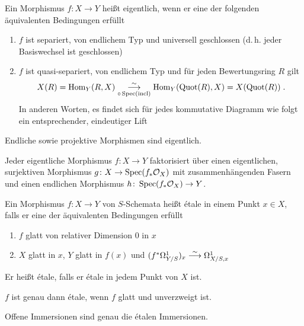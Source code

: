 \documentclass[german]{scrreprt}
\begin{document}
\begin{Definition}
  Ein Morphismus $f\colon X\to Y$ heißt eigentlich, wenn er eine der
  folgenden äquivalenten Bedingungen erfüllt
  \begin{enumerate}[label=(\roman*)]
  \item $f$ ist separiert, von endlichem Typ und universell
    geschlossen (d.\,h. jeder Basiswechsel ist geschlossen)
  \item $f$ ist quasi-separiert, von endlichem Typ und für jeden
    Bewertungsring $R$ gilt
    \begin{gather*}
      X(R)=\operatorname{Hom}_Y(R, X) 
      \overset{\sim}{\underset{\circ\operatorname{Spec}(\operatorname{incl})}
        {\longrightarrow}}
      \operatorname{Hom}_Y(\operatorname{Quot}(R), X)=X(\operatorname{Quot}(R))\;.
    \end{gather*}
    In anderen Worten, es findet sich für jedes kommutative Diagramm
    wie folgt ein entsprechender, eindeutiger Lift
    \begin{center}
    \end{center}
  \end{enumerate}
  Endliche sowie projektive Morphismen sind eigentlich.
  \cite[9.5, Remark 5 und Theorem 9]{bosch}

  \begin{Bemerkung}
    Jeder eigentliche Morphismus $f\colon X\to Y$ faktorisiert über
    einen eigentlichen, surjektiven Morphismus $g\colon X\to
    \operatorname{Spec}(f_*\mathcal{O}_X)$ mit zusammenhängenden Fasern und einen endlichen
    Morphismus $h\colon \operatorname{Spec}(f_*\mathcal{O}_X)\to Y$.
    \cite[9.5, Theorem 12]{bosch}
  \end{Bemerkung}
\end{Definition}


\begin{Definition}%
  Ein Morphismus $f\colon X\to Y$ von $S$-Schemata heißt étale in
  einem Punkt $x\in X$, falls er eine der äquivalenten Bedingungen
  erfüllt 
  \begin{enumerate}[label=(\roman*)]
  \item $f$ glatt von relativer Dimension 0 in $x$
  \item $X$ glatt in $x$, $Y$ glatt in $f(x)$ und 
    $(f^*\Omega_{Y/S}^1)_x \overset{\sim}{\longrightarrow} \Omega_{X/S,x}^1$
  \end{enumerate}
  Er heißt étale, falls er étale in jedem Punkt von $X$ ist.
  \cite[8.5, Definition 1 und Corollary 12]{bosch}  

  $f$ ist genau dann étale, wenn $f$ glatt und unverzweigt ist.
  \cite[8.5, Proposition 6]{bosch}

  Offene Immersionen sind genau die étalen Immersionen.
  \cite[8.5, Lemma 7]{bosch}
\end{Definition}
\end{document}
